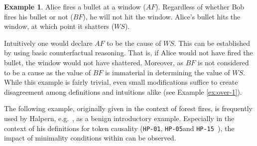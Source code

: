 \documentclass[11pt,a4paper]{book}
\theoremstyle{definition}
\theoremstyle{definition}
\newtheorem{example}{Example}[section]
\theoremstyle{definition}
\theoremstyle{remark}
\newcommand{\hpo}{\texttt{HP-01}}
\newcommand{\hpu}{\texttt{HP-05}}
\newcommand{\hpm}{\texttt{HP-15 }}
\begin{document}
\begin{example}
\label{ex:basic-1}
Alice fires a bullet at a window ($AF$). Regardless of whether Bob fires his bullet or not ($BF$), he will not hit the window. Alice's bullet hits the window, at which point it shatters ($WS$).

\begin{center}
\end{center}


\end{example}

Intuitively one would declare $AF$ to be the cause of $WS$. This can be established by using basic counterfactual reasoning. That is, if Alice would not have fired the bullet, the window would not have shattered. 
Moreover, as $BF$ is not considered to be a cause as the value of $BF$ is immaterial in determining the value of $WS$.
While this example is fairly trivial, even small modifications suffice to create disagreement among definitions and intuitions alike (see Example \ref{ex:over-1}).


The following example, originally given in the context of forest fires, is frequently used by Halpern, e.g.\ \parencite{halpern2011actual,halpern2015graded}, as a benign introductory example.
Especially in the context of his definitions for token causality (\hpo, \hpu and \hpm), the impact of minimality conditions within can be observed.
\end{document}
